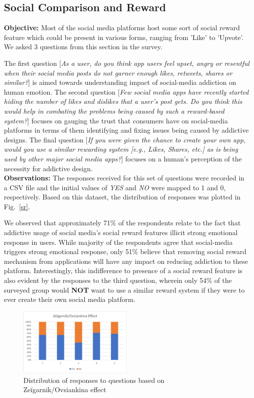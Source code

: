 \documentclass[conference]{IEEEtran}
\begin{document}
\subsection{Social Comparison and Reward} 
\textbf{Objective:} Most of the social media platforms host some sort of social reward feature which could be present in various forms, ranging from 'Like' to 'Upvote'. We asked 3 questions from this section in the survey.

The first question [\textit{As a user, do you think app users feel upset, angry or resentful when their social media posts do not garner enough likes, retweets, shares or similar?}] is aimed towards understanding impact of social-media addiction on human emotion. The second question [\textit{Few social media apps have recently started hiding the number of likes and dislikes that a user's post gets. Do you think this would help in combating the problems being caused by such a reward-based system?}] focuses on gauging the trust that  consumers have on social-media platforms in terms of them identifying and fixing issues being caused by addictive designs. The final question [\textit{If you were given the chance to create your own app, would you use a similar rewarding system [e.g., Likes, Shares, etc.] as is being used by other major social media apps?}] focuses on a human's perception of the necessity for addictive design.\\

\textbf{Observations:} The responses received for this set of questions were recorded in a CSV file and the initial values of \textit{YES} and \textit{NO} were mapped to 1 and 0, respectively. Based on this dataset, the distribution of responses was plotted in Fig.~\ref{sr}. 

We observed that approximately 71\% of the respondents relate to the fact that addictive usage of social media's social reward features illicit strong emotional response in users. While majority of the respondents agree that social-media triggers strong emotional response, only 51\% believe that removing social reward mechanism from applications will have any impact on reducing addiction to these platform. Interestingly, this indifference to presence of a social reward feature is also evident by the responses to the third question, wherein only 54\% of the surveyed group would \textbf{NOT} want to use a similar reward system if they were to ever create their own social media platform.

\begin{figure}[htbp]
\centerline{\includegraphics[width=0.5\textwidth]{ovi1.png}}
\caption{Distribution of responses to questions based on Zeĭgarnik/Ovsiankina effect}
\label{ovi1}
\end{figure}
\end{document}
